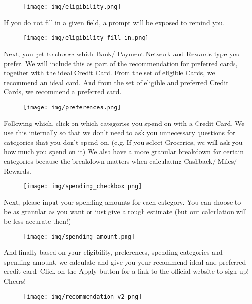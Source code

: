 \documentclass[12pt]{article}
\begin{document}
		\begin{figure}[H]
			\centering
			\texttt{[image: img/eligibility.png]}
		\end{figure}

		If you do not fill in a given field, a prompt will be exposed to remind you.

		\begin{figure}[H]
			\centering
			\texttt{[image: img/eligibility\_fill\_in.png]}
		\end{figure}

		Next, you get to choose which Bank/ Payment Network and Rewards type you prefer. We will include this as part of the recommendation for preferred cards, together with the ideal Credit Card. From the set of eligible Cards, we recommend an ideal card. And from the set of eligible and preferred Credit Cards, we recommend a preferred card.

		\begin{figure}[H]
			\centering
			\texttt{[image: img/preferences.png]}
		\end{figure}

		Following which, click on which categories you spend on with a Credit Card. We use this internally so that we don’t need to ask you unnecessary questions for categories that you don’t spend on. (e.g. If you select Groceries, we will ask you how much you spend on it) We also have a more granular breakdown for certain categories because the breakdown matters when calculating Cashback/ Miles/ Rewards.

		\begin{figure}[H]
			\centering
			\texttt{[image: img/spending\_checkbox.png]}
		\end{figure}

		Next, please input your spending amounts for each category. You can choose to be as granular as you want or just give a rough estimate (but our calculation will be less accurate then!)

		\begin{figure}[H]
			\centering
			\texttt{[image: img/spending\_amount.png]}
		\end{figure}

		And finally based on your eligibility, preferences, spending categories and spending amount, we calculate and give you your recommend ideal and preferred credit card. Click on the Apply button for a link to the official website to sign up! Cheers!

		\begin{figure}[H]
			\centering
			\texttt{[image: img/recommendation\_v2.png]}
		\end{figure}
\end{document}
